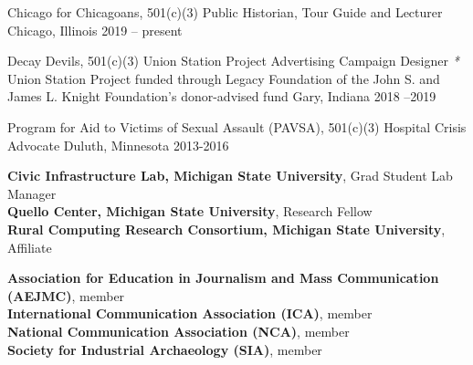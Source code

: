 \begin{cvhonors}
  \cvhonor
    {Chicago for Chicagoans, 501(c)(3) } 
    {Public Historian, Tour Guide and Lecturer } 
    {Chicago, Illinois} 
    {2019 -- present} 

  \cvhonor
    {Decay Devils, 501(c)(3) } %
    {Union Station Project Advertising Campaign Designer \scriptsize{\textit{*} Union Station Project funded through Legacy Foundation of the John S. and James L. Knight Foundation's donor-advised fund}} %
    {Gary, Indiana} %
    {2018 --2019} %
    
  \cvhonor
    {Program for Aid to Victims of Sexual Assault (PAVSA), 501(c)(3) } 
    {Hospital Crisis Advocate} 
    {Duluth, Minnesota} 
    {2013-2016} 
\end{cvhonors}

\newpage

\begin{small} \color{black}

\textbf{Civic Infrastructure Lab, Michigan State University}, Grad Student Lab Manager  \\
\textbf{Quello Center, Michigan State University}, Research Fellow \\
\textbf{Rural Computing Research Consortium, Michigan State University}, Affiliate \\
\end{small}

\begin{small} \color{black}

\textbf{Association for Education in Journalism and Mass Communication (AEJMC)}, member  \\
\textbf{International Communication Association (ICA)}, member  \\
\textbf{National Communication Association (NCA)}, member  \\
\textbf{Society for Industrial Archaeology (SIA)}, member \\
\end{small}

